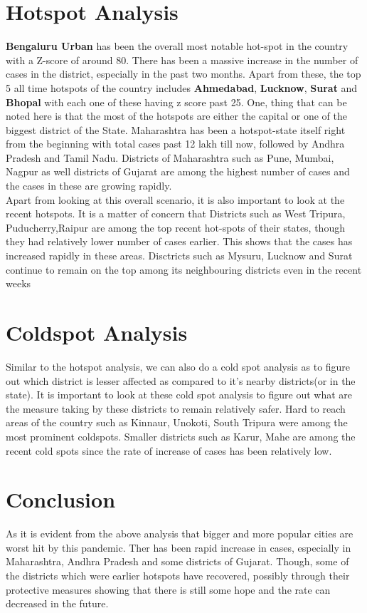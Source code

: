 \documentclass[11pt]{article}
\begin{document}
\section{Hotspot Analysis}
\textbf{Bengaluru Urban} has been the overall most notable hot-spot in the country with a Z-score of around 80. There has been a massive increase in the number of cases in the district, especially in the past two months. Apart from these, the top 5 all time hotspots of the country includes \textbf{Ahmedabad},
\textbf{Lucknow}, \textbf{Surat} and \textbf{Bhopal} with each one of these having z score past 25. One, thing that can be noted here is that the most of the hotspots are either the capital or one of the biggest district of the State. Maharashtra has been a hotspot-state itself right from the beginning with total cases past 12 lakh till now, followed by Andhra Pradesh and Tamil Nadu. Districts of Maharashtra such as Pune, Mumbai, Nagpur as well districts of Gujarat are among the highest number of cases and the cases in these are growing rapidly. \\
Apart from looking at this overall scenario, it is also important to look at the recent hotspots. It is a matter of concern that Districts such as West Tripura, Puducherry,Raipur are among the top recent hot-spots of their states, though they had relatively lower number of cases earlier. This shows that the cases has increased rapidly in these areas. Disctricts such as Mysuru, Lucknow and Surat continue to remain on the top among its neighbouring districts even in the recent weeks


\section{Coldspot Analysis}
Similar to the hotspot analysis, we can also do a cold spot analysis as to figure out which district is lesser affected as compared to it's nearby districts(or in the state). It is important to look at these cold spot analysis to figure out what are the measure taking by these districts to remain relatively safer. Hard to reach areas of the country such as Kinnaur, Unokoti, South Tripura were among the most prominent coldspots. Smaller districts such as Karur, Mahe are among the recent cold spots since the rate of increase of cases has been relatively low.

\section{Conclusion}
As it is evident from the above analysis that bigger and more popular cities are worst hit by this pandemic. Ther has been rapid increase in cases, especially in Maharashtra, Andhra Pradesh and some districts of Gujarat. Though, some of the districts which were earlier hotspots have recovered, possibly through their protective measures showing that there is still some hope and the rate can decreased in the future.
\end{document}
